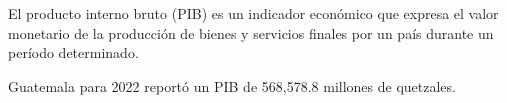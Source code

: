 El producto interno bruto (PIB) es un indicador económico que expresa el valor monetario de la producción de bienes y servicios finales por un país durante un período determinado.

Guatemala para 2022 reportó un PIB de 568,578.8 millones de quetzales.